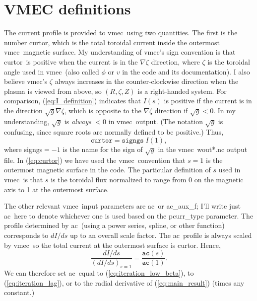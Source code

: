 \documentclass[11pt,letter]{article}
\newcommand{\vmec}{{\ttfamily vmec}}
\newcommand{\curtor}{{\ttfamily curtor}}
\newcommand{\ac}{{\ttfamily ac}}
\begin{document}
\section{VMEC definitions}



The current profile is provided to \vmec~using two quantities. The first is the number \curtor, which is
the total toroidal current inside the outermost \vmec~magnetic surface. My understanding of \vmec's sign convention is
that \curtor~is positive when the current is in the $\nabla\zeta$ direction, where $\zeta$ is the toroidal angle
used in \vmec~(also called $\phi$ or $v$ in the code and its documentation).
I also believe \vmec's $\zeta$ always increases in the counter-clockwise direction when the plasma
is viewed from above, so $(R,\zeta,Z)$ is a right-handed system.
For comparison, (\ref{eq:I_definition}) indicates that $I(s)$ is positive if the current is in the direction
$\sqrt{g} \nabla\zeta$, which is opposite to the $\nabla \zeta$ direction if $\sqrt{g} < 0$. 
In my understanding, $\sqrt{g}$ is \emph{always} $<0$ in
\vmec~output.
(The notation $\sqrt{g}$ is confusing, since square roots are normally defined to be positive.)
Thus, 
\begin{equation}
\mathtt{curtor} = \mathtt{signgs} \;I(1),
\label{eq:curtor}
\end{equation}
where {\ttfamily signgs}$=- 1$ is the 
name for the sign of $\sqrt{g}$ in the \vmec~{\ttfamily wout*.nc} output file.
In (\ref{eq:curtor}) we have used the \vmec~convention that $s=1$ is the
outermost magnetic surface in the code.
The particular definition of $s$ used in \vmec~is that $s$ is the toroidal flux
normalized to range from 0 on the magnetic axis to 1 at the outermost surface.


The other relevant \vmec~input parameters are \ac~or {\ttfamily ac\_aux\_f}; I'll write just \ac~here 
to denote whichever one is used based on the {\ttfamily pcurr\_type} parameter. The profile determined by \ac~(using a power series, spline, or other function) corresponds to 
$dI/ds$ up to an overall scale factor.
The \ac~profile is always scaled by \vmec~so the total current at the outermost surface is \curtor.
Hence,
\begin{equation}
\frac{dI/ds}{(dI/ds)_{s=1}}
=\frac{\mathtt{ac}(s)}{\mathtt{ac}(1)}.
\end{equation}
We can therefore set \ac~equal to (\ref{eq:iteration_low_beta}), to (\ref{eq:iteration_lag}), or to the radial derivative
of (\ref{eq:main_result}) (times any constant.)
\end{document}
